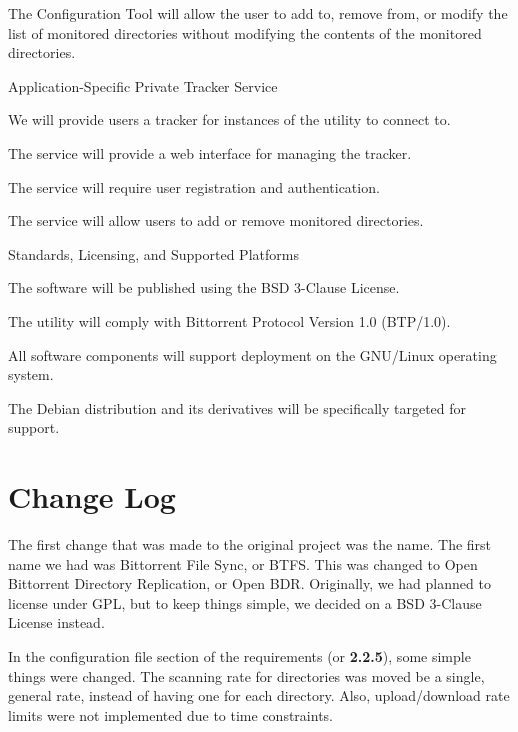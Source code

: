 \documentclass[12 pt]{article}
\begin{document}
\begin{enum}
\begin{enum}
\begin{enum}
				\item The Configuration Tool will allow the user to add to, remove from, or modify the list of monitored directories without modifying the contents of the monitored directories.
			\end{enum}
			\item Application-Specific Private Tracker Service
			\begin{enum}
				\item We will provide users a tracker for instances of the utility to connect to.
				\item The service will provide a web interface for managing the tracker.
				\item The service will require user registration and authentication.
				\item The service will allow users to add or remove monitored directories.
			\end{enum}
		\end{enum}
		\item Standards, Licensing, and Supported Platforms
		\begin{enum}
			\item The software will be published using the BSD 3-Clause License.
			\item The utility will comply with Bittorrent Protocol Version 1.0 (BTP/1.0).
			\item All software components will support deployment on the GNU/Linux operating system.
			\begin{enum}
				\item The Debian distribution and its derivatives will be specifically targeted for support.
			\end{enum}
		\end{enum}
	\end{enum}
	
	\section{Change Log}
	
	The first change that was made to the original project was the name. The first name we had was Bittorrent File Sync, or BTFS. This was changed to Open Bittorrent Directory Replication, or Open BDR. Originally, we had planned to license under GPL, but to keep things simple, we decided on a BSD 3-Clause License instead. 
	
	In the configuration file section of the requirements (or \textbf{2.2.5}), some simple things were changed. The scanning rate for directories was moved be a single, general rate, instead of having one for each directory. Also, upload/download rate limits were not implemented due to time constraints.
	
\end{document}
